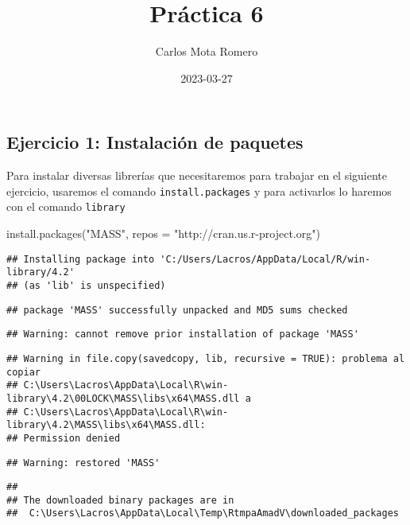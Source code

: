 \documentclass[
]{article}
\title{Práctica 6}
\author{Carlos Mota Romero}
\date{2023-03-27}
\newenvironment{Shaded}{\begin{snugshade}}{\end{snugshade}}
\newcommand{\AttributeTok}[1]{\textcolor[rgb]{0.77,0.63,0.00}{#1}}
\newcommand{\FunctionTok}[1]{\textcolor[rgb]{0.00,0.00,0.00}{#1}}
\newcommand{\NormalTok}[1]{#1}
\newcommand{\StringTok}[1]{\textcolor[rgb]{0.31,0.60,0.02}{#1}}
\begin{document}
\maketitle

\hypertarget{ejercicio-1-instalaciuxf3n-de-paquetes}{%
\subsection{Ejercicio 1: Instalación de
paquetes}\label{ejercicio-1-instalaciuxf3n-de-paquetes}}

Para instalar diversas librerías que necesitaremos para trabajar en el
siguiente ejercicio, usaremos el comando \texttt{install.packages} y
para activarlos lo haremos con el comando \texttt{library}

\begin{Shaded}
\begin{Highlighting}[]
\FunctionTok{install.packages}\NormalTok{(}\StringTok{"MASS"}\NormalTok{, }\AttributeTok{repos =} \StringTok{"http://cran.us.r{-}project.org"}\NormalTok{)}
\end{Highlighting}
\end{Shaded}

\begin{verbatim}
## Installing package into 'C:/Users/Lacros/AppData/Local/R/win-library/4.2'
## (as 'lib' is unspecified)
\end{verbatim}

\begin{verbatim}
## package 'MASS' successfully unpacked and MD5 sums checked
\end{verbatim}

\begin{verbatim}
## Warning: cannot remove prior installation of package 'MASS'
\end{verbatim}

\begin{verbatim}
## Warning in file.copy(savedcopy, lib, recursive = TRUE): problema al copiar
## C:\Users\Lacros\AppData\Local\R\win-library\4.2\00LOCK\MASS\libs\x64\MASS.dll a
## C:\Users\Lacros\AppData\Local\R\win-library\4.2\MASS\libs\x64\MASS.dll:
## Permission denied
\end{verbatim}

\begin{verbatim}
## Warning: restored 'MASS'
\end{verbatim}

\begin{verbatim}
## 
## The downloaded binary packages are in
##  C:\Users\Lacros\AppData\Local\Temp\RtmpaAmadV\downloaded_packages
\end{verbatim}
\end{document}
